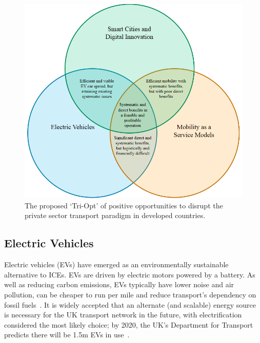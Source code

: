 \documentclass[journal]{IEEEtran}
\begin{document}
\begin{figure}[!htb]
\centering
\includegraphics[width=\columnwidth]{images/triopt.png}
\caption{The proposed `Tri-Opt' of positive opportunities to disrupt
  the private sector transport paradigm in developed countries.}
\label{fig:triopt}
\end{figure}



\subsection{Electric Vehicles}

Electric vehicles (EVs) have emerged as an environmentally sustainable
alternative to ICEs. EVs are driven by electric
motors powered by a battery. As well as reducing carbon emissions, EVs
typically have lower noise and air pollution, can be cheaper to run
per mile and reduce transport's dependency on fossil
fuels~\cite{postevs:2010}. It is widely accepted that an alternate
(and scalable) energy source is necessary for the UK transport network
in the future, with electrification considered the most likely choice;
by 2020, the UK's Department for Transport predicts there will be 1.5m
EVs in use~\cite{dft:2008}.
\end{document}
